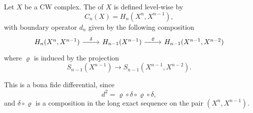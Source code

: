 \documentclass[main.tex]{subfiles}
\begin{document}
\begin{definition}
  \label{def:cellular_chain_complex}
  Let $X$ be a CW complex. The  of $X$ is defined level-wise by
  \begin{equation*}
    C_{n}(X) = H_{n}(X^{n}, X^{n-1}),
  \end{equation*}
  with boundary operator $d_{n}$ given by the following composition
  \begin{equation*}
    \begin{tikzcd}
      H_{n}(X^{n}, X^{n-1})
      \arrow[r, "\delta"]
      & H_{n-1}(X^{n-1})
      \arrow[r, "\varrho"]
      & H_{n-1}(X^{n-1}, X^{n-2})
    \end{tikzcd}
  \end{equation*}
  where $\varrho$ is induced by the projection
  \begin{equation*}
    S_{n-1}(X^{n-1}) \to S_{n-1}(X^{n-1}, X^{n-2}).
  \end{equation*}
\end{definition}

This is a bona fide differential, since
\begin{equation*}
  d^{2} = \varrho \circ \delta \circ \varrho \circ \delta,
\end{equation*}
and $\delta \circ \varrho$ is a composition in the long exact sequence on the pair $(X^{n}, X^{n-1})$.
\end{document}
